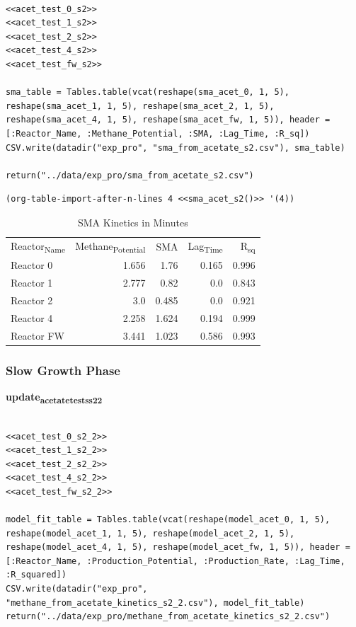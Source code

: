 \documentclass[11pt]{article}
\begin{document}
\begin{verbatim}

<<acet_test_0_s2>>
<<acet_test_1_s2>>
<<acet_test_2_s2>>
<<acet_test_4_s2>>
<<acet_test_fw_s2>>

sma_table = Tables.table(vcat(reshape(sma_acet_0, 1, 5), reshape(sma_acet_1, 1, 5), reshape(sma_acet_2, 1, 5), reshape(sma_acet_4, 1, 5), reshape(sma_acet_fw, 1, 5)), header = [:Reactor_Name, :Methane_Potential, :SMA, :Lag_Time, :R_sq])
CSV.write(datadir("exp_pro", "sma_from_acetate_s2.csv"), sma_table)

return("../data/exp_pro/sma_from_acetate_s2.csv")
\end{verbatim}

\begin{verbatim}
(org-table-import-after-n-lines 4 <<sma_acet_s2()>> '(4))
\end{verbatim}

\begin{table}[htbp]
\caption{SMA Kinetics in Minutes}
\centering
\begin{tabular}{lrrrr}
Reactor\textsubscript{Name} & Methane\textsubscript{Potential} & SMA & Lag\textsubscript{Time} & R\textsubscript{sq}\\[0pt]
Reactor 0 & 1.656 & 1.76 & 0.165 & 0.996\\[0pt]
Reactor 1 & 2.777 & 0.82 & 0.0 & 0.843\\[0pt]
Reactor 2 & 3.0 & 0.485 & 0.0 & 0.921\\[0pt]
Reactor 4 & 2.258 & 1.624 & 0.194 & 0.999\\[0pt]
Reactor FW & 3.441 & 1.023 & 0.586 & 0.993\\[0pt]
\end{tabular}
\end{table}

\subsubsection{Slow Growth Phase}
\label{sec:org088d528}
\textbf{update\textsubscript{acetate}\textsubscript{tests}\textsubscript{s2}\textsubscript{2}}
\begin{verbatim}

<<acet_test_0_s2_2>>
<<acet_test_1_s2_2>>
<<acet_test_2_s2_2>>
<<acet_test_4_s2_2>>
<<acet_test_fw_s2_2>>

model_fit_table = Tables.table(vcat(reshape(model_acet_0, 1, 5), reshape(model_acet_1, 1, 5), reshape(model_acet_2, 1, 5), reshape(model_acet_4, 1, 5), reshape(model_acet_fw, 1, 5)), header = [:Reactor_Name, :Production_Potential, :Production_Rate, :Lag_Time, :R_squared])
CSV.write(datadir("exp_pro", "methane_from_acetate_kinetics_s2_2.csv"), model_fit_table)
return("../data/exp_pro/methane_from_acetate_kinetics_s2_2.csv")
\end{verbatim}
\end{document}
